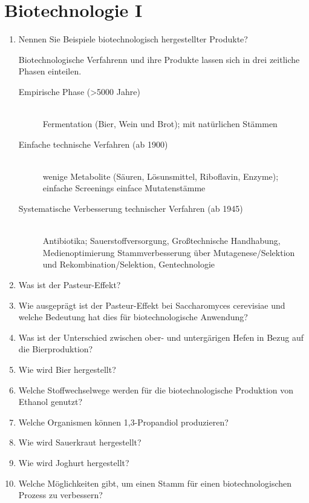 
\section{Biotechnologie I}
\begin{enumerate}
	\item Nennen Sie Beispiele biotechnologisch hergestellter Produkte?
		
		 Biotechnologische Verfahrenn und ihre Produkte lassen sich in drei
		 zeitliche Phasen einteilen.
		 \begin{description}
		 	\item[Empirische Phase (>5000 Jahre)] \hfill \\
				Fermentation (Bier, Wein und Brot); mit natürlichen Stämmen
			\item[Einfache technische Verfahren (ab 1900)] \hfill \\
				wenige Metabolite (Säuren, Lösunsmittel, Riboflavin, Enzyme);
				einfache Screenings \textrightarrow einface Mutatenstämme
			\item[Systematische Verbesserung technischer Verfahren (ab 1945)] \hfill \\
				Antibiotika; Sauerstoffversorgung, Großtechnische Handhabung, Medienoptimierung
				Stammverbesserung über Mutagenese/Selektion und Rekombination/Selektion, Gentechnologie 
		\end{description}

	\item Was ist der Pasteur-Effekt?
	\item Wie ausgeprägt ist der Pasteur-Effekt bei Saccharomyces cerevisiae und welche Bedeutung hat dies für biotechnologische Anwendung?
	\item Was ist der Unterschied zwischen ober- und untergärigen Hefen in Bezug auf die Bierproduktion?
	\item Wie wird Bier hergestellt?
	\item Welche Stoffwechselwege werden für die biotechnologische Produktion von Ethanol genutzt?
	\item Welche Organismen können 1,3-Propandiol produzieren?
	\item Wie wird Sauerkraut hergestellt?
	\item Wie wird Joghurt hergestellt?
	\item Welche Möglichkeiten gibt, um einen Stamm für einen biotechnologischen Prozess zu verbessern?
\end{enumerate}
